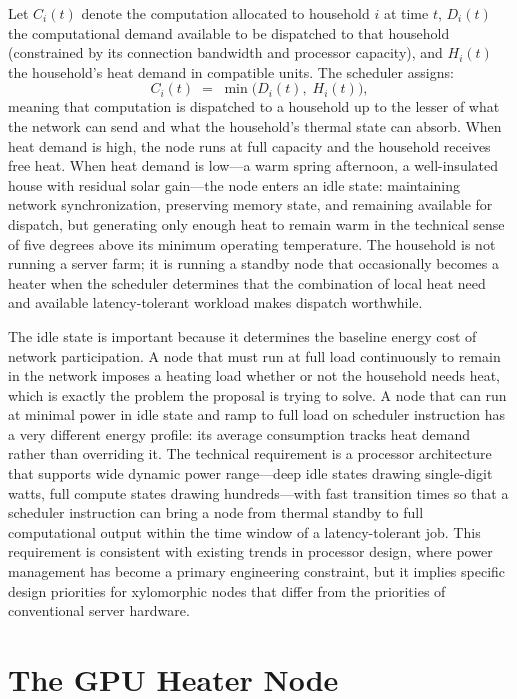 \documentclass[12pt, oneside]{article}
\begin{document}
Let $C_i(t)$ denote the computation allocated to household $i$ at time $t$, $D_i(t)$ the computational demand available to be dispatched to that household (constrained by its connection bandwidth and processor capacity), and $H_i(t)$ the household's heat demand in compatible units. The scheduler assigns:
\[
C_i(t) \;=\; \min\!\bigl(D_i(t),\; H_i(t)\bigr),
\]
meaning that computation is dispatched to a household up to the lesser of what the network can send and what the household's thermal state can absorb. When heat demand is high, the node runs at full capacity and the household receives free heat. When heat demand is low---a warm spring afternoon, a well-insulated house with residual solar gain---the node enters an idle state: maintaining network synchronization, preserving memory state, and remaining available for dispatch, but generating only enough heat to remain warm in the technical sense of five degrees above its minimum operating temperature. The household is not running a server farm; it is running a standby node that occasionally becomes a heater when the scheduler determines that the combination of local heat need and available latency-tolerant workload makes dispatch worthwhile.

The idle state is important because it determines the baseline energy cost of network participation. A node that must run at full load continuously to remain in the network imposes a heating load whether or not the household needs heat, which is exactly the problem the proposal is trying to solve. A node that can run at minimal power in idle state and ramp to full load on scheduler instruction has a very different energy profile: its average consumption tracks heat demand rather than overriding it. The technical requirement is a processor architecture that supports wide dynamic power range---deep idle states drawing single-digit watts, full compute states drawing hundreds---with fast transition times so that a scheduler instruction can bring a node from thermal standby to full computational output within the time window of a latency-tolerant job. This requirement is consistent with existing trends in processor design, where power management has become a primary engineering constraint, but it implies specific design priorities for xylomorphic nodes that differ from the priorities of conventional server hardware.

\section{The GPU Heater Node}
\end{document}
